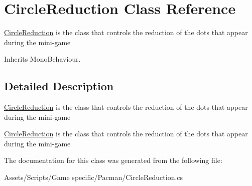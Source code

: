 \hypertarget{class_circle_reduction}{\section{Circle\-Reduction Class Reference}
\label{class_circle_reduction}
}


\hyperlink{class_circle_reduction}{Circle\-Reduction} is the class that controls the reduction of the dots that appear during the mini-\/game  




Inherits Mono\-Behaviour.



\subsection{Detailed Description}
\hyperlink{class_circle_reduction}{Circle\-Reduction} is the class that controls the reduction of the dots that appear during the mini-\/game 

\hyperlink{class_circle_reduction}{Circle\-Reduction} is the class that controls the reduction of the dots that appear during the mini-\/game 

The documentation for this class was generated from the following file\-:\begin{DoxyCompactItemize}
\item 
Assets/\-Scripts/\-Game specific/\-Pacman/Circle\-Reduction.\-cs\end{DoxyCompactItemize}
